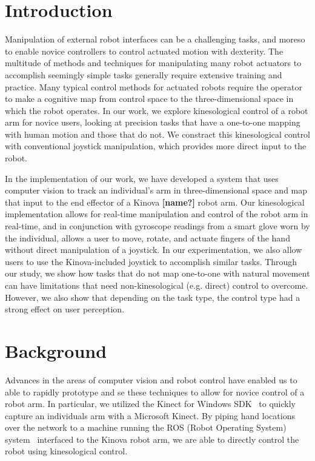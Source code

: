 \documentclass{sigchi}
\begin{document}


\section{Introduction}

Manipulation of external robot interfaces can be a challenging tasks, and moreso to enable novice controllers to control actuated motion with dexterity.  The multitude of methods and techniques for manipulating many robot actuators to accomplish seemingly simple tasks generally require extensive training and practice.  Many typical control methods for actuated robots require the operator to make a cognitive map from control space to the three-dimensional space in which the robot operates.  In our work, we explore kinesological control of a robot arm for novice users, looking at precision tasks that have a one-to-one mapping with human motion and those that do not.  We constract this kinesological control with conventional joystick manipulation, which provides more direct input to the robot.  

In the implementation of our work, we have developed a system that uses computer vision to track an individual's arm in three-dimensional space and map that input to the end effector of a Kinova \textbf{[name?]} robot arm.  Our kinesological implementation allows for real-time manipulation and control of the robot arm in real-time, and in conjunction with gyroscope readings from a smart glove worn by the individual, allows a user to move, rotate, and actuate fingers of the hand without direct manipulation of a joystick. In our experimentation, we also allow users to use the Kinova-included joystick to accomplish similar tasks. Through our study, we show how tasks that do not map one-to-one with natural movement can have limitations that need non-kinesological (e.g. direct) control to overcome.  However, we also show that depending on the task type, the control type had a strong effect on user perception.


\section{Background}

Advances in the areas of computer vision and robot control have enabled us to able to rapidly prototype and se these techniques to allow for novice control of a robot arm.  In particular, we utilized the Kinect for Windows SDK~\cite{kinectSDK} to quickly capture an individuals arm with a Microsoft Kinect.  By piping hand locations over the network to a machine running the ROS (Robot Operating System) system~\cite{ROS} interfaced to the Kinova robot arm, we are able to directly control the robot using kinesological control.
\end{document}
